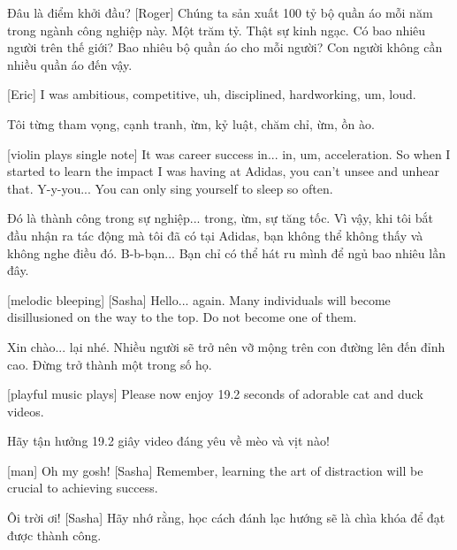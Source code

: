 \documentclass[a4paper]{article}
\begin{document}
	\begin{vietnamese-v2}
		Đâu là điểm khởi đầu? 
		[Roger] Chúng ta sản xuất 100 tỷ bộ quần áo mỗi năm trong ngành công nghiệp này. 
		Một trăm tỷ. 
		Thật sự kinh ngạc. 
		Có bao nhiêu người trên thế giới? Bao nhiêu bộ quần áo cho mỗi người? Con người không cần nhiều quần áo đến vậy.
	\end{vietnamese-v2}

	[Eric] I was ambitious,	competitive, uh, disciplined, hardworking, um, loud.
	
	\begin{vietnamese-v2}
		[Eric] Tôi từng tham vọng, cạnh tranh, ừm, kỷ luật, chăm chỉ, ừm, ồn ào.
	\end{vietnamese-v2}

	[violin plays single note]
	It was career success in... in, um, acceleration. So when I started to learn the impact I was having at Adidas, you can't unsee and unhear that.
	Y-y-you... You can only sing yourself to sleep so often.
	
	\begin{vietnamese-v2}
		Đó là thành công trong sự nghiệp... trong, ừm, sự tăng tốc. 
		Vì vậy, khi tôi bắt đầu nhận ra tác động mà tôi đã có tại Adidas, bạn không thể không thấy và không nghe điều đó.
		B-b-bạn... Bạn chỉ có thể hát ru mình để ngủ bao nhiêu lần đây.
	\end{vietnamese-v2}
	
	[melodic bleeping]
	[Sasha] Hello... again.
	Many individuals will become disillusioned on the way to the top. Do not become one of them.
	
	\begin{vietnamese-v2}
		 Xin chào... lại nhé. 
		Nhiều người sẽ trở nên vỡ mộng trên con đường lên đến đỉnh cao. Đừng trở thành một trong số họ.
	\end{vietnamese-v2}

	[playful music plays]
	Please now enjoy 19.2 seconds of adorable cat and duck videos.
	
	\begin{vietnamese-v2}
		Hãy tận hưởng 19.2 giây video đáng yêu về mèo và vịt nào!
	\end{vietnamese-v2}
	
	[man] Oh my gosh!
	[Sasha] Remember, learning the art of distraction will be crucial to achieving success.
	
	\begin{vietnamese-v2}
		 Ôi trời ơi! 
		[Sasha] Hãy nhớ rằng, học cách đánh lạc hướng sẽ là chìa khóa để đạt được thành công.
	\end{vietnamese-v2}
	
\end{document}
